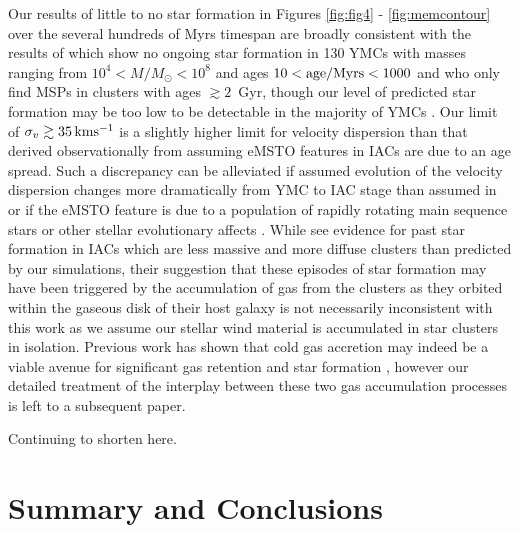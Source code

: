 \documentclass[fleqn,usenatbib]{mnras}
\begin{document}
 Our results of little to no star formation in Figures \ref{fig:fig4} - \ref{fig:memcontour} over the several hundreds of Myrs timespan are broadly consistent with the results of \cite{bastian2013a} which show no ongoing star formation in 130 YMCs with masses ranging from $10^4 < M/M_\odot < 10^8$ and ages $10 < {\rm age/Myrs} < 1000$ and \cite{mart2018} who only find MSPs in clusters with ages $\gtrsim 2$~Gyr, though our level of predicted star formation may be too low to be detectable in the majority of YMCs \citep{peacock2013}.
  Our limit of $\sigma_v \gtrsim 35 \, {\rm km s^{-1}}$ is a slightly higher limit for velocity dispersion than that derived observationally from assuming eMSTO features in IACs \citep{goud2014} are due to an age spread.  Such a discrepancy can be alleviated if assumed evolution of the velocity dispersion changes more dramatically from YMC to IAC stage than assumed in \cite{goud2014} or if the eMSTO feature is due to a population of rapidly rotating main sequence stars  \citep{cabrera2016,bastian2016,piatti2016} or other stellar evolutionary affects \citep{bastian2017}.
While \cite{li2016} see evidence for past star formation in IACs which are less massive and more diffuse clusters than predicted by our simulations, their suggestion that these episodes of star formation may have been triggered by the accumulation of gas from the clusters as they orbited within the gaseous disk of their host galaxy is not necessarily inconsistent with this work as we assume our stellar wind material is accumulated in star clusters in isolation.  Previous work has shown that cold gas accretion may indeed be a viable avenue for significant gas retention and star formation \citep{naiman2009,conroy2011a,conroy2011b,priestley2011,naiman2011,conroy2012}, however our detailed treatment of the interplay between these two gas accumulation processes is left to a subsequent paper. 


Continuing to shorten here.





\section{Summary and Conclusions} \label{section:conclusions}
\end{document}
